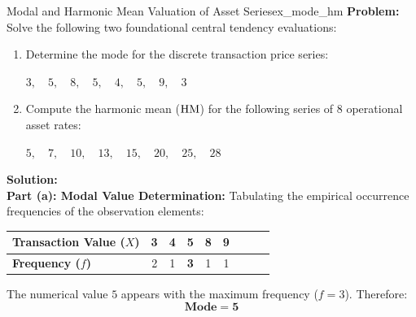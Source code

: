 \begin{example}{Modal and Harmonic Mean Valuation of Asset Series}{ex_mode_hm}
\textbf{Problem:} \\
Solve the following two foundational central tendency evaluations:
\begin{enumerate}[label=(\alph*), leftmargin=*]
    \item Determine the mode for the discrete transaction price series:
    \begin{center}
        $3, \quad 5, \quad 8, \quad 5, \quad 4, \quad 5, \quad 9, \quad 3$
    \end{center}
    \item Compute the harmonic mean ($\operatorname{HM}$) for the following series of 8 operational asset rates:
    \begin{center}
        $5, \quad 7, \quad 10, \quad 13, \quad 15, \quad 20, \quad 25, \quad 28$
    \end{center}
\end{enumerate}

\tcbline
\textbf{Solution:} \\
\textbf{Part (a): Modal Value Determination:}
Tabulating the empirical occurrence frequencies of the observation elements:
\begin{center}
\small
\renewcommand{\arraystretch}{1.1}
\begin{tabular}{lcccccccc}
\toprule
\textbf{Transaction Value ($X$)} & 3 & 4 & 5 & 8 & 9 \\
\midrule
\textbf{Frequency ($f$)}         & 2 & 1 & \textbf{3} & 1 & 1 \\
\bottomrule
\end{tabular}
\end{center}
The numerical value $5$ appears with the maximum frequency ($f = 3$). Therefore:
\begin{equation*}
    \mathbf{\text{Mode} = 5}
\end{equation*}


\end{example}
